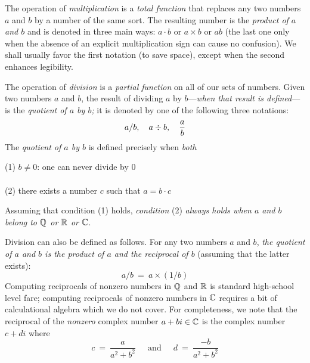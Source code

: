 The operation of {\it multiplication} is a {\em total function} that replaces any two numbers $a$ and $b$ by a number of the same sort.  The resulting number is the {\em product of $a$ and $b$} and is denoted in three main ways: $a \cdot b$ or $a \times b$ or $ab$ (the last one only when the absence of an explicit multiplication sign can cause no confusion).  We shall usually favor the first notation (to save space), except when the second enhances legibility.

\smallskip

 
 
 

The operation of {\it division} is a {\em partial function} on all of our sets of numbers.  Given two numbers $a$ and $b$, the result of dividing $a$ by $b$---{\em when that result is defined}---is the {\it quotient of $a$ by $b$;} it is denoted by one of the following three notations:
\[  a/b, \ \ \ a \div b, \ \ \ {a \over b}  \]
The {\it quotient of $a$ by $b$} is defined precisely when {\em both}

\noindent
\hspace*{.35in}(1) $b \neq 0$: one can never divide by $0$ \\
\hspace*{.35in}{\em and} \\
\hspace*{.35in}(2) there exists a number $c$ such that $a = b \cdot c$

\noindent
Assuming that condition (1) holds, {\em condition} (2) {\em always holds when $a$ and $b$ belong to $\mathbb{Q}$ or $\mathbb{R}$ or $\mathbb{C}$}.

\smallskip

Division can also be defined as follows.  For any two numbers $a$ and $b$, {\em the quotient of $a$ and $b$ is the product of $a$ and the reciprocal of $b$} (assuming that the latter exists):
\[ a/b \ = \ a \times (1/b) \]
Computing reciprocals of nonzero numbers in $\mathbb{Q}$ and $\mathbb{R}$ is standard high-school level fare; computing reciprocals of nonzero numbers in $\mathbb{C}$ requires a bit of calculational algebra which we do not cover.  For completeness, we note that the reciprocal of the {\em nonzero} complex number $a + bi \in \mathbb{C}$ is the complex number $c+di$ where
\[ c \ = \ \frac{a}{a^2 + b^2} \ \ \ \ \
\mbox{ and } \ \ \ \ \
d \ = \ \frac{-b}{a^2 + b^2}
\]


